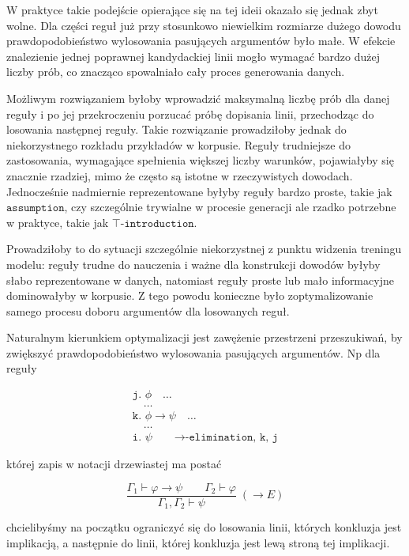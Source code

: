 \documentclass[shortabstract]{iithesis}
\theoremstyle{definition}
\theoremstyle{remark}
\theoremstyle{plain}
\begin{document}
W praktyce takie podejście opierające się na tej ideii okazało się jednak zbyt wolne. Dla części reguł już przy
stosunkowo niewielkim rozmiarze dużego dowodu prawdopodobieństwo wylosowania
pasujących argumentów było małe. W efekcie znalezienie jednej poprawnej kandydackiej
linii mogło wymagać bardzo dużej liczby prób, co znacząco spowalniało cały proces
generowania danych.

Możliwym rozwiązaniem byłoby wprowadzić maksymalną liczbę prób dla danej reguły i po jej
przekroczeniu porzucać próbę dopisania linii, przechodząc do losowania następnej
reguły. Takie rozwiązanie prowadziłoby jednak do niekorzystnego rozkładu przykładów
w korpusie. Reguły trudniejsze do zastosowania, wymagające spełnienia większej
liczby warunków, pojawiałyby się znacznie rzadziej, mimo że często są istotne w
rzeczywistych dowodach. Jednocześnie nadmiernie reprezentowane byłyby reguły
bardzo proste, takie jak \(\texttt{assumption}\), czy szczególnie trywialne w procesie generacji ale
rzadko potrzebne w praktyce, takie jak \(\top\texttt{-introduction}\).

Prowadziłoby to do sytuacji szczególnie niekorzystnej z punktu widzenia treningu
modelu: reguły trudne do nauczenia i ważne dla konstrukcji dowodów byłyby słabo
reprezentowane w danych, natomiast reguły proste lub mało informacyjne dominowałyby
w korpusie. Z tego powodu konieczne było zoptymalizowanie samego procesu doboru
argumentów dla losowanych reguł.

Naturalnym kierunkiem optymalizacji jest zawężenie przestrzeni przeszukiwań, by 
zwiększyć prawdopodobieństwo wylosowania pasujących argumentów. Np dla reguły 


\[
\begin{array}{l}
\texttt{j. } \phi \quad \dots \\
\quad \dots \\
\texttt{k. } \phi \to \psi \quad \dots \\
\quad \dots \\
\texttt{i. } \psi \qquad \texttt{→-elimination, k, j}
\end{array}
\]

której zapis w notacji drzewiastej ma postać

$$
\frac{\Gamma_1 \vdash \varphi \to \psi \qquad \Gamma_2 \vdash \varphi}
     {\Gamma_1,\Gamma_2 \vdash \psi}\;(\to E)
$$

chcielibyśmy na początku ograniczyć się do losowania linii, których konkluzja jest implikacją,
a następnie do linii, której konkluzja jest lewą stroną tej implikacji.
\end{document}
